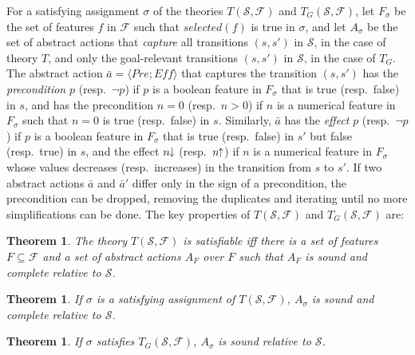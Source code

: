\documentclass[letterpaper]{article} %
\newcommand{\tup}[1]{\langle #1 \rangle}
\newtheorem{theorem}[definition]{Theorem}
\newcommand{\F}{\mathcal{F}}
\renewcommand{\S}{\mathcal{S}}
\newcommand{\Eff}{{\mathit{Eff}}}
\newcommand{\abst}[2]{\tup{#1;#2}}
\newcommand{\pplus}{\hspace{-.05em}\raisebox{.15ex}{\footnotesize$\uparrow$}}
\newcommand{\mminus}{\hspace{-.05em}\raisebox{.15ex}{\footnotesize$\downarrow$}}
\begin{document}
For a satisfying assignment $\sigma$ of the theories $T(\S,\F)$ and $T_G(\S,\F)$, let
$F_{\sigma}$ be the set of features $f$ in $\F$ such that $selected(f)$
is true in $\sigma$, and let $A_{\sigma}$ be the set of abstract actions
that \emph{capture} all transitions $(s,s')$ in $\S$, in the case of theory $T$,
and only the goal-relevant transitions $(s,s')$ in $\S$, in the case of $T_G$.
The abstract action $\bar{a}=\abst{Pre}{\Eff}$ that captures the transition $(s,s')$
has the \emph{precondition} $p$ (resp.\ $\neg p$) if $p$ is a boolean feature in
$F_{\sigma}$ that is true (resp.\ false) in $s$, and has the precondition $n=0$
(resp.\ $n > 0$) if $n$ is a numerical feature in $F_{\sigma}$ such that $n=0$
is true (resp.\ false) in $s$. Similarly, $\bar{a}$ has the \emph{effect} $p$
(resp.\ $\neg p$) if $p$ is a boolean feature in $F_{\sigma}$ that is true
(resp.\ false) in $s'$ but false (resp.\ true) in $s$, and the effect $n\mminus$
(resp.\ $n\pplus$) if $n$ is a numerical feature in $F_{\sigma}$ whose values
decreases (resp.\ increases) in the transition from $s$ to $s'$. 
If two abstract actions $\bar{a}$ and $\bar{a}'$ differ only in the sign of a
precondition, the precondition can be dropped, removing the duplicates and
iterating until no more simplifications can be done. The key properties of $T(\S,\F)$ and $T_G(\S,\F)$ are:

\begin{theorem}
  The theory $T(\S,\F)$ is satisfiable iff there is a set of features $F \subseteq \F$
  and a set of abstract actions $A_F$ over $F$ such that $A_F$ is sound and complete relative to  $\S$.
\end{theorem}

\begin{theorem}
  If $\sigma$ is a satisfying assignment of $T(\S,\F)$, 
  $A_{\sigma}$ is sound and complete relative to $\S$.
\end{theorem}

\begin{theorem}
  If $\sigma$ satisfies  $T_G(\S,\F)$, $A_{\sigma}$  is sound relative to $\S$.
\end{theorem}
\end{document}
